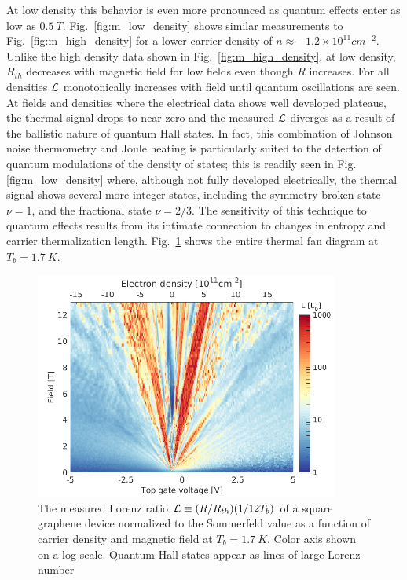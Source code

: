 At low density this behavior is even more pronounced as quantum effects enter as low as $0.5~T$. Fig.~\ref{fig:m_low_density} shows similar measurements to Fig.~\ref{fig:m_high_density} for a lower carrier density of $n\approx-1.2\times10^{11}cm^{-2}$. Unlike the high density data shown in Fig.~\ref{fig:m_high_density}, at low density, $R_{th}$ decreases with magnetic field for low fields even though $R$ increases. For all densities $\mathcal{L}$ monotonically increases with field until quantum oscillations are seen. At fields and densities where the electrical data shows well developed plateaus, the thermal signal drops to near zero and the measured $\mathcal{L}$ diverges as a result of the ballistic nature of quantum Hall states. In fact, this combination of Johnson noise thermometry and Joule heating is particularly suited to the detection of quantum modulations of the density of states; this is readily seen in Fig.\ref{fig:m_low_density} where, although not fully developed electrically, the thermal signal shows several more integer states, including the symmetry broken state $\nu=1$, and the fractional state $\nu = 2/3$. The sensitivity of this technique to quantum effects results from its intimate connection to changes in entropy and carrier thermalization length. Fig.~\ref{fig:m_L} shows the entire thermal fan diagram at $T_b=1.7~K$.
\begin{figure}
\centering
\includegraphics[width=100mm]{figures/magneto/Fan_L.png}
\caption{The measured Lorenz ratio $\mathcal{L} \equiv (R/R_{th})(1/12T_b)$ of a square graphene device normalized to the Sommerfeld value as a function of carrier density and magnetic field at $T_b=1.7~K$. Color axis shown on a log scale. Quantum Hall states appear as lines of large Lorenz number}
\label{fig:m_L}
\end{figure}

